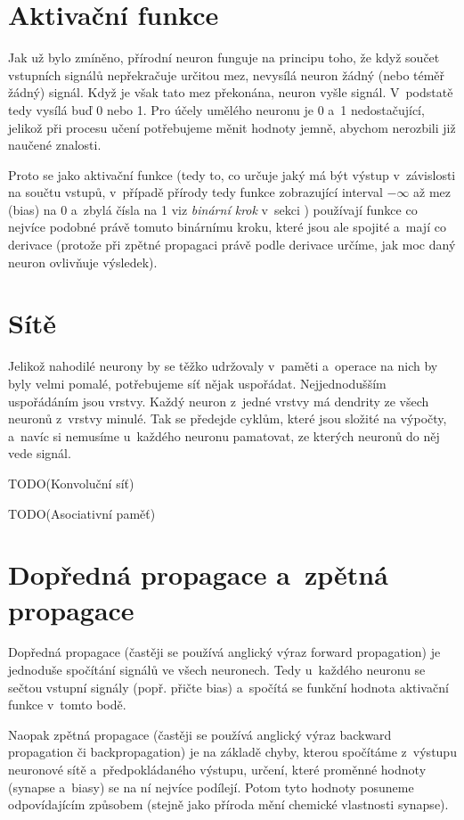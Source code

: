 \documentclass[12pt]{report}			%
\begin{document}
				\section{Aktivační funkce}
					Jak už bylo zmíněno, přírodní neuron funguje na principu toho, že když součet vstupních signálů nepřekračuje určitou mez, nevysílá neuron žádný (nebo téměř žádný) signál. Když je však tato mez překonána, neuron vyšle signál. V~podstatě tedy vysílá buď 0 nebo 1. Pro účely umělého neuronu je 0 a~1 nedostačující, jelikož při procesu učení potřebujeme měnit hodnoty jemně, abychom nerozbili již naučené znalosti.
					
					Proto se jako aktivační funkce (tedy to, co určuje jaký má být výstup v~závislosti na součtu vstupů, v~případě přírody tedy funkce zobrazující interval $-\infty$ až mez (bias) na 0 a~zbylá čísla na 1 viz \emph{binární krok} v~sekci \label{s:fa}) používají funkce co nejvíce podobné právě tomuto binárnímu kroku, které jsou ale spojité a~mají co  derivace (protože při zpětné propagaci právě podle derivace určíme, jak moc daný neuron ovlivňuje výsledek).
				
				\section{Sítě}
					Jelikož nahodilé neurony by se těžko udržovaly v~paměti a~operace na nich by byly velmi pomalé, potřebujeme síť nějak uspořádat. Nejjednodušším uspořádáním jsou vrstvy. Každý neuron z~jedné vrstvy má \gls{dendrit}y ze všech neuronů z~vrstvy minulé. Tak se předejde cyklům, které jsou složité na výpočty, a~navíc si nemusíme u~každého neuronu pamatovat, ze kterých neuronů do něj vede signál.
					
					TODO(Konvoluční síť)
					
					TODO(Asociativní paměť)
					
				\section{Dopředná propagace a~zpětná propagace}
					Dopředná propagace (častěji se používá anglický výraz forward propagation) je jednoduše spočítání signálů ve všech neuronech. Tedy u~každého neuronu se sečtou vstupní signály (popř. přičte bias) a~spočítá se funkční hodnota aktivační funkce v~tomto bodě.
					
					Naopak zpětná propagace (častěji se používá anglický výraz backward propagation či back\-propagation) je na základě chyby, kterou spočítáme z~výstupu neuronové sítě a~předpokládaného výstupu, určení, které proměnné hodnoty (\gls{synapse} a~biasy) se na ní nejvíce podílejí. Potom tyto hodnoty posuneme odpovídajícím způsobem (stejně jako příroda mění chemické vlastnosti \gls{synapse}).
					
\end{document}
